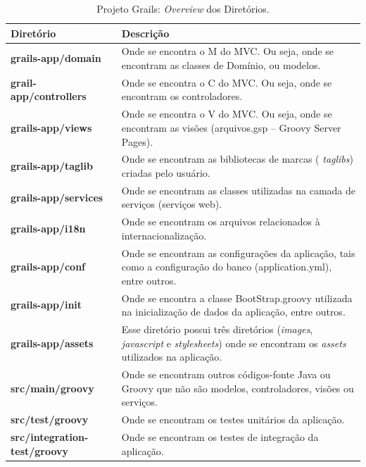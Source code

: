\vspace{0.5cm}

\begin{table}[htbp]
\centering
\begin{tabular}{p{4.5cm} | p{9cm}}

\toprule 
\rowcolor{Gray} 

\textbf{Diretório} & \textbf{Descrição}\\ 
\midrule
{\bf  grails-app/domain} &  Onde  se  encontra o  M  do MVC.  Ou  seja, onde  se
encontram as classes de Domínio, ou modelos.  \\ 
\midrule
{\bf grail-app/controllers}  & Onde se  encontra o C  do MVC.  Ou seja,  onde se
encontram os controladores.  \\ 
\midrule
{\bf  grails-app/views} &  Onde  se  encontra o  V  do MVC.   Ou  seja, onde  se
encontram as visões (arquivos.gsp – Groovy Server Pages). \\ 
\midrule
{\bf  grails-app/taglib} &  Onde se  encontram  as bibliotecas  de marcas  ({\it
  taglibs}) criadas pelo usuário. \\ 
\midrule
{\bf grails-app/services} & Onde se encontram as classes utilizadas na camada de
serviços (serviços web). \\ 
\midrule 
{\bf  grails-app/i18n}   &  Onde  se   encontram  os  arquivos   relacionados  à
internacionalização.  \\ 
\midrule
{\bf grails-app/conf}  & Onde se  encontram as configurações da  aplicação, tais
como a configuração do banco (application.yml), entre outros. \\ 
\midrule
{\bf grails-app/init} & Onde se  encontra a classe BootStrap.groovy utilizada na
inicialização de dados da aplicação, entre outros. \\ 
\midrule
{\bf grails-app/assets}  & Esse diretório possui três  diretórios ({\it images},
{\it  javascript}  e  {\it  stylesheets})  onde se  encontram  os  {\it  assets}
utilizados na aplicação. \\ 
\midrule
{\bf src/main/groovy}  & Onde se  encontram outros códigos-fonte Java  ou Groovy
que não são modelos, controladores, visões ou serviços. \\ 
\midrule   
{\bf src/test/groovy} & Onde se encontram os testes unitários da aplicação.  \\ 
\midrule
{\bf src/integration-test/groovy} & Onde se encontram os testes de integração da
aplicação.  \\ 
\bottomrule
\end{tabular}
\caption{Projeto Grails: {\it Overview} dos Diretórios.}
\label{grailsTbl}
\end{table}

